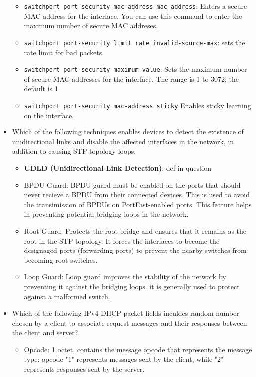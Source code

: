\begin{itemize}
    \begin{itemize}
        \item \verb|switchport port-security mac-address mac_address|: Enters a secure MAC address for the interface. You can use this command to enter the maximum number of secure MAC addreses.
        \item \verb|switchport port-security limit rate invalid-source-max|: sets the rate limit for bad packets.
        \item \verb|switchport port-security maximum value|: Sets the maximum number of secure MAC addresses for the interface. The range is 1 to 3072; the default is 1.
        \item \verb|switchport port-security mac-address sticky| Enables sticky learning on the interface.
    \end{itemize}
    \item Which of the following techniques enables devices to detect the existence of unidirectional links and disable the affected interfaces in the network, in addition to causing STP topology loops.
    \begin{itemize}
        \item \textbf{UDLD (Unidirectional Link Detection)}: def in question
        \item BPDU Guard: BPDU guard must be enabled on the ports that should never recieve a BPDU from their connected devices. This is used to avoid the transimission of BPDUs on PortFast-enabled ports. This feature helps in preventing potential bridging loops in the network.
        \item Root Guard: Protects the root bridge and ensures that it remains as the root in the STP topology. It forces the interfaces to become the designaged ports (forwarding ports) to prevent the nearby switches from becoming root switches.
        \item Loop Guard: Loop guard improves the stability of the network by preventing it against the bridging loops. it is generally used to protect against a malformed switch.
    \end{itemize}
    \item Which of the following IPv4 DHCP packet fields inculdes random number chosen by a client to associate request messages and their responses between the client and server?
    \begin{itemize}
        \item Opcode: 1 octet, contains the message opcode that represents the message type: opcode "1" represents messages sent by the client, while "2" represents responses sent by the server.

\end{itemize}
\end{itemize}
